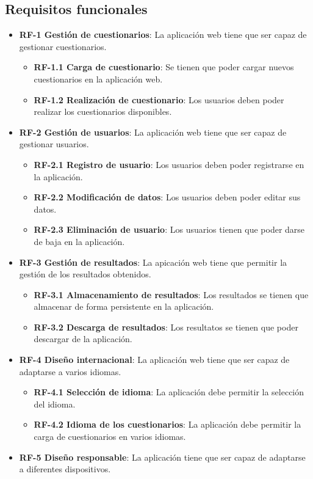 \subsection{Requisitos funcionales}
\begin{itemize}
	\item \textbf{RF-1 Gestión de cuestionarios}: La aplicación web tiene que ser capaz de gestionar cuestionarios.
	\begin{itemize}
		\item \textbf{RF-1.1 Carga de cuestionario}: Se tienen que poder cargar nuevos cuestionarios en la aplicación web.
		\item \textbf{RF-1.2 Realización de cuestionario}: Los usuarios deben poder realizar los cuestionarios disponibles.
	\end{itemize}
	\item \textbf{RF-2 Gestión de usuarios}: La aplicación web tiene que ser capaz de gestionar usuarios.
		\begin{itemize}
		\item \textbf{RF-2.1 Registro de usuario}: Los usuarios deben poder registrarse en la aplicación.
		\item \textbf{RF-2.2 Modificación de datos}: Los usuarios deben poder editar sus datos.
		\item \textbf{RF-2.3 Eliminación de usuario}: Los usuarios tienen que poder darse de baja en la aplicación.
	\end{itemize}
	\item \textbf{RF-3 Gestión de resultados}: La apicación web tiene que permitir la gestión de los resultados obtenidos.
		\begin{itemize}
		\item \textbf{RF-3.1 Almacenamiento de resultados}: Los resultados se tienen que almacenar de forma persistente en la aplicación.
		\item \textbf{RF-3.2 Descarga de resultados}: Los resultatos se tienen que poder descargar de la aplicación.
	\end{itemize}
	\item \textbf{RF-4 Diseño internacional}: La aplicación web tiene que ser capaz de adaptarse a varios idiomas.
		\begin{itemize}
		\item \textbf{RF-4.1 Selección de idioma}: La aplicación debe permitir la selección del idioma.
		\item \textbf{RF-4.2 Idioma de los cuestionarios}: La aplicación debe permitir la carga de cuestionarios en varios idiomas.
	\end{itemize}
	\item \textbf{RF-5 Diseño responsable}: La aplicación tiene que ser capaz de adaptarse a diferentes dispositivos.
\end{itemize}



